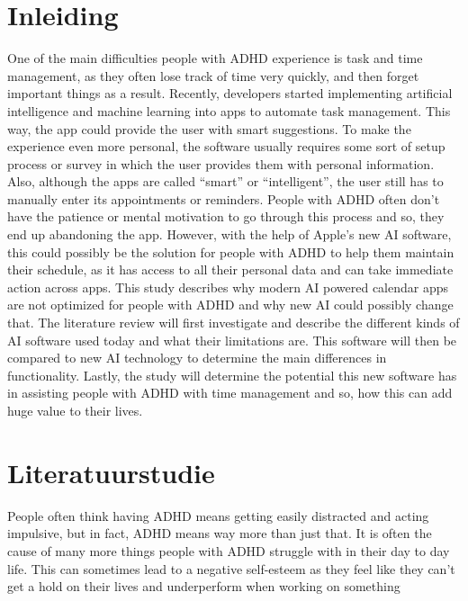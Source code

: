 \documentclass[english]{hogent-article}
\begin{document}
\section{Inleiding}%
\label{sec:inleiding}


One of the main difficulties people with ADHD experience is task and time management, as they often lose track of time very quickly, and then forget important things as a result. Recently, developers started implementing artificial intelligence and machine learning into apps to automate task management. This way, the app could provide the user with smart suggestions. To make the experience even more personal,  the software usually requires some sort of setup process or survey in which the user provides them with personal information. Also, although the apps are called “smart” or “intelligent”, the user still has to manually enter its appointments or reminders. People with ADHD often don't have the patience or mental motivation to go through this process and so, they end up abandoning the app. However, with the help of Apple's new AI software, this could possibly be the solution for people with ADHD to help them maintain their schedule, as it has access to all their personal data and can take immediate action across apps. This study describes why modern AI powered calendar apps are not optimized for people with ADHD and why new AI could possibly change that. The literature review will first investigate and describe the different kinds of AI software used today and what their limitations are. This software will then be compared to new AI technology to determine the main differences in functionality. Lastly, the study will determine the potential this new software has in assisting people with ADHD with time management and so, how this can add huge value to their lives.

\section{Literatuurstudie}%
\label{sec:literatuurstudie}


People often think having ADHD means getting easily distracted and acting impulsive, but in fact, ADHD means way more than just that. It is often the cause of many more things people with ADHD struggle with in their day to day life. This can sometimes lead to a negative self-esteem as they feel like they can’t get a hold on their lives and underperform when working on something
\end{document}
